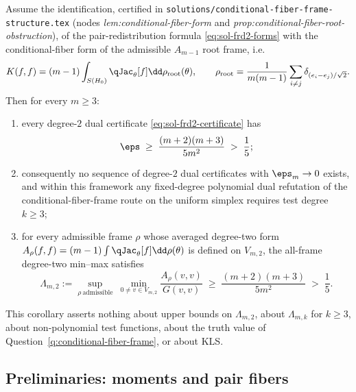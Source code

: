 \documentclass[../main.tex]{subfiles}
\begin{document}
\begin{corollary}
\label{cor:sol-frd2-no-degree-two-refuter}
Assume the identification, certified in
\texttt{solutions/conditional-fiber-frame-structure.tex} (nodes
\emph{lem:conditional-fiber-form} and
\emph{prop:conditional-fiber-root-obstruction}), of the pair-redistribution formula
\eqref{eq:sol-frd2-forms} with the conditional-fiber form of the admissible
$A_{m-1}$ root frame, i.e.
\begin{equation}
  K(f,f)=(m-1)\int_{S(H_0)}\qJac_\theta[f]\dd\rho_{\rm root}(\theta),
  \qquad
  \rho_{\rm root}=\frac1{m(m-1)}\sum_{i\ne j}\delta_{(e_i-e_j)/\sqrt2}.
  \label{eq:sol-frd2-root-identification}
\end{equation}
Then for every $m\ge3$:
\begin{enumerate}
\item every degree-$2$ dual certificate \eqref{eq:sol-frd2-certificate} has
  \begin{equation}
    \eps\;\ge\;\frac{(m+2)(m+3)}{5m^2}\;>\;\frac15;
  \end{equation}
\item consequently no sequence of degree-$2$ dual certificates with
  $\eps_m\to0$ exists, and within this framework any fixed-degree polynomial dual
  refutation of the conditional-fiber-frame route on the uniform simplex requires
  test degree $k\ge3$;
\item for every admissible frame $\rho$ whose averaged degree-two form
  $A_\rho(f,f)=(m-1)\int\qJac_\theta[f]\dd\rho(\theta)$ is defined on $V_{m,2}$, the
  all-frame degree-two min--max satisfies
  \begin{equation}
    \Lambda_{m,2}
    :=\sup_{\rho\ \text{admissible}}
      \ \min_{0\ne v\in V_{m,2}}\frac{A_\rho(v,v)}{G(v,v)}
    \;\ge\;\frac{(m+2)(m+3)}{5m^2}\;>\;\frac15 .
  \end{equation}
\end{enumerate}
This corollary asserts nothing about upper bounds on $\Lambda_{m,2}$, about
$\Lambda_{m,k}$ for $k\ge3$, about non-polynomial test functions, about the truth
value of Question~\ref{q:conditional-fiber-frame}, or about KLS.
\end{corollary}

\subsection*{Preliminaries: moments and pair fibers}
\end{document}
